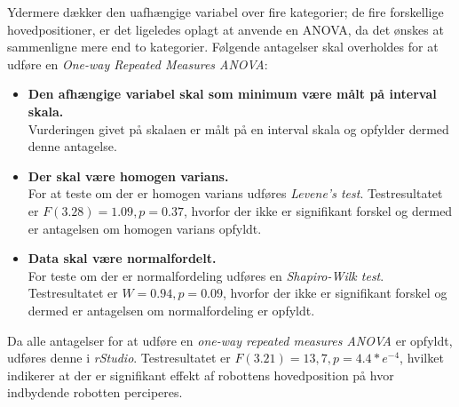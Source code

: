 Ydermere dækker den uafhængige variabel over fire kategorier; de fire forskellige hovedpositioner, er det ligeledes oplagt at anvende en ANOVA, da det ønskes at sammenligne mere end to kategorier.\blankline
%
Følgende antagelser skal overholdes for at udføre en \textit{One-way Repeated Measures ANOVA}: \blankline  
%
\begin{itemize}
	\item \textbf{Den afhængige variabel skal som minimum være målt på interval skala.}\\
	Vurderingen givet på skalaen er målt på en interval skala og opfylder dermed denne antagelse.
	\item \textbf{Der skal være homogen varians. }\\
	For at teste om der er homogen varians udføres \textit{Levene's test}. Testresultatet er $F(3.28)=1.09, p=0.37$, hvorfor der ikke er signifikant forskel og dermed er antagelsen om homogen varians opfyldt. 
	\item \textbf{Data skal være normalfordelt.}\\
	For teste om der er normalfordeling udføres en \textit{Shapiro-Wilk test}. Testresultatet er $W=0.94, p=0.09$, hvorfor der ikke er signifikant forskel og dermed er antagelsen om normalfordeling er opfyldt.\blankline
\end{itemize}
\noindent
%
Da alle antagelser for at udføre en \textit{one-way repeated measures ANOVA} er opfyldt, udføres denne i \textit{rStudio}. Testresultatet er $F(3.21)=13,7, p=4.4*e^{-4}$, hvilket indikerer at der er signifikant effekt af robottens hovedposition på hvor indbydende robotten perciperes.


